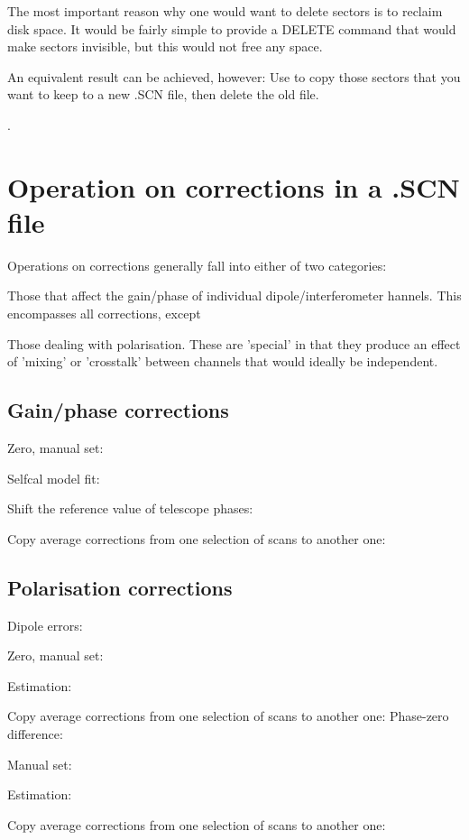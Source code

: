         The most important reason why one would want to delete sectors is to
reclaim disk space. It would be fairly simple to provide a DELETE command that
would make sectors invisible, but this would not free any space. 

        An equivalent result can be achieved, however: Use 
 to copy those sectors that you want to keep to a
new .SCN file, then delete the old file. 

. 
\section{ Operation on corrections in a .SCN file} 
\label{.corrections} 

        Operations on corrections generally fall into either of two categories: 
\bi 
\item   Those that affect the gain/phase of individual dipole/interferometer 
        hannels. This encompasses all corrections, except 

\item   Those dealing with polarisation. These are 'special' in that they 
        produce an effect of 'mixing' or 'crosstalk' between channels that
would 
        ideally be independent. 
\ei 


\subsection{ Gain/phase corrections} 
\label{.gain.phase} 

\bi 
\item   Zero, manual set:  
\item   Selfcal model fit:  
\item   Shift the reference value of telescope phases:  
\item   Copy average corrections from one selection of scans to another one: 
\ei 


\subsection{ Polarisation corrections } 
\label{.polarisation} 

Dipole errors: 
\bi 
\item   Zero, manual set:  
\item   Estimation:  
\item   Copy average corrections from one selection of scans to another one: 
\ei 
\noindent Phase-zero difference: 
\bi 
\item   Manual set:  
\item   Estimation:  
\item   Copy average corrections from one selection of scans to another one: 
\ei 


